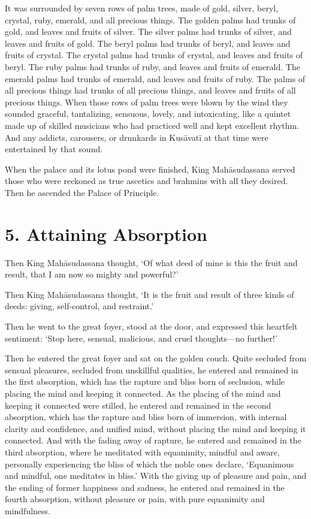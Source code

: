 \documentclass[12pt,openany]{book}%
\begin{document}
It was surrounded by seven rows of palm trees, made of gold, silver, beryl, crystal, ruby, emerald, and all precious things. The golden palms had trunks of gold, and leaves and fruits of silver. The silver palms had trunks of silver, and leaves and fruits of gold. The beryl palms had trunks of beryl, and leaves and fruits of crystal. The crystal palms had trunks of crystal, and leaves and fruits of beryl. The ruby palms had trunks of ruby, and leaves and fruits of emerald. The emerald palms had trunks of emerald, and leaves and fruits of ruby. The palms of all precious things had trunks of all precious things, and leaves and fruits of all precious things. When those rows of palm trees were blown by the wind they sounded graceful, tantalizing, sensuous, lovely, and intoxicating, like a quintet made up of skilled musicians who had practiced well and kept excellent rhythm. And any addicts, carousers, or drunkards in \textsanskrit{Kusāvatī} at that time were entertained by that sound. 

When the palace and its lotus pond were finished, King \textsanskrit{Mahāsudassana} served those who were reckoned as true ascetics and brahmins with all they desired. Then he ascended the Palace of Principle. 

\section*{5. Attaining Absorption }

Then King \textsanskrit{Mahāsudassana} thought, ‘Of what deed of mine is this the fruit and result, that I am now so mighty and powerful?’ 

Then King \textsanskrit{Mahāsudassana} thought, ‘It is the fruit and result of three kinds of deeds: giving, self-control, and restraint.’ 

Then he went to the great foyer, stood at the door, and expressed this heartfelt sentiment: ‘Stop here, sensual, malicious, and cruel thoughts—no further!’ 

Then he entered the great foyer and sat on the golden couch. Quite secluded from sensual pleasures, secluded from unskillful qualities, he entered and remained in the first absorption, which has the rapture and bliss born of seclusion, while placing the mind and keeping it connected. As the placing of the mind and keeping it connected were stilled, he entered and remained in the second absorption, which has the rapture and bliss born of immersion, with internal clarity and confidence, and unified mind, without placing the mind and keeping it connected. And with the fading away of rapture, he entered and remained in the third absorption, where he meditated with equanimity, mindful and aware, personally experiencing the bliss of which the noble ones declare, ‘Equanimous and mindful, one meditates in bliss.’ With the giving up of pleasure and pain, and the ending of former happiness and sadness, he entered and remained in the fourth absorption, without pleasure or pain, with pure equanimity and mindfulness. 
\end{document}
